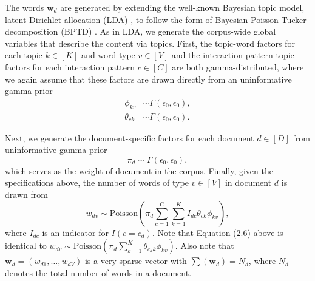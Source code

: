 \documentclass[ba]{imsart}
\numberwithin{equation}{section}
\theoremstyle{plain}
\begin{document}
The words $\boldsymbol{w}_d$ are generated by extending the well-known Bayesian topic model, latent Dirichlet allocation (LDA) \citep{Blei2003}, to follow the form of Bayesian Poisson Tucker decomposition (BPTD) \citep{schein2016bayesian}. As in LDA, we generate the corpus-wide global variables that describe the content via topics. First, the topic-word factors for each topic $k\in [K]$ and word type $v\in [V]$ and the interaction pattern-topic factors for each interaction pattern $c \in [C]$ are both gamma-distributed, where we again assume that these factors are drawn directly from an uninformative gamma prior
\begin{equation}
\begin{aligned}
\phi_{kv}& \sim  \Gamma(\epsilon_0,\epsilon_0),\\
\theta_{ck}& \sim  \Gamma(\epsilon_0,\epsilon_0).
\end{aligned}
\end{equation}

Next, we generate the document-specific factors for each document $d \in [D]$ from uninformative gamma prior
\begin{equation}
\pi_{d}\sim \Gamma(\epsilon_0,\epsilon_0),
\end{equation}
which serves as the weight of document in the corpus. Finally, given the specifications above, the number of words of type $v\in [V]$ in document $d$ is drawn from 
\begin{equation}
w_{dv} \sim \mbox{Poisson}(\pi_{d}\sum_{c=1}^C \sum_{k=1}^K I_{dc} \theta_{ck}\phi_{kv}),
\end{equation}
where $I_{dc}$ is an indicator for $I(c=c_d)$. Note that Equation (2.6) above is identical to $w_{dv} \sim \mbox{Poisson}(\pi_{d}\sum_{k=1}^K \theta_{c_dk}\phi_{kv})$. Also note that $\boldsymbol{w}_d = (w_{d1},\ldots,w_{dV})$ is a very sparse vector with $\sum(\boldsymbol{w}_d) = N_d$, where $N_d$ denotes the total number of words in a document. ~
\end{document}
